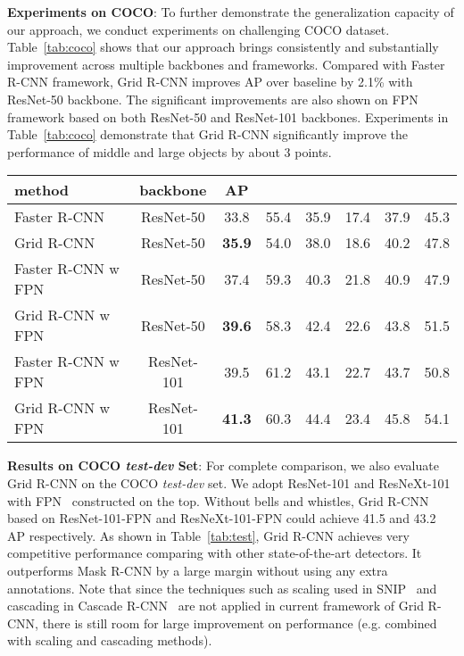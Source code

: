 \documentclass[10pt,twocolumn,letterpaper]{article}
\begin{document}
\textbf{Experiments on COCO}: To further demonstrate the generalization capacity of our approach, we conduct experiments on challenging COCO dataset. Table~\ref{tab:coco} shows that our approach brings consistently and substantially improvement across multiple backbones and frameworks. Compared with Faster R-CNN framework, Grid R-CNN improves AP over baseline by 2.1\% with ResNet-50 backbone. The significant improvements are also shown on FPN framework based on both ResNet-50 and ResNet-101 backbones. Experiments in Table~\ref{tab:coco} demonstrate that Grid R-CNN significantly improve the performance of middle and large objects by about 3 points.
\begin{table*}[t]
\begin{center}
\begin{tabular}{ l | c | c | c  c | c  c  c }
\hline
method & backbone & AP &  &  &  &  &  \\
\hline
Faster R-CNN & ResNet-50 & 33.8 & 55.4 & 35.9 & 17.4 & 37.9 & 45.3 \\
Grid R-CNN & ResNet-50 & \textbf{35.9} & 54.0 & 38.0 & 18.6 & 40.2 & 47.8 \\
\hline
Faster R-CNN w FPN & ResNet-50 & 37.4 & 59.3 & 40.3 & 21.8 & 40.9 & 47.9 \\
Grid R-CNN w FPN & ResNet-50 & \textbf{39.6} & 58.3 & 42.4 & 22.6 & 43.8 & 51.5 \\
\hline
Faster R-CNN w FPN & ResNet-101 & 39.5 & 61.2 & 43.1 & 22.7 & 43.7 & 50.8 \\
Grid R-CNN w FPN & ResNet-101 & \textbf{41.3} & 60.3 & 44.4 & 23.4 & 45.8 & 54.1 \\
\hline
\end{tabular}
\vspace{1mm}
\caption{Bounding box detection AP on COCO \textit{minival}. Grid R-CNN outperforms both Faster R-CNN and FPN on ResNet-50 and ResNet-101 backbone. }
\label{tab:coco}
\end{center}
\end{table*}

\textbf{Results on COCO \textit{test-dev} Set}: For complete comparison, we also evaluate Grid R-CNN on the COCO \textit{test-dev} set. We adopt ResNet-101 and ResNeXt-101~\cite{xie2017aggregated} with FPN~\cite{lin2017feature} constructed on the top. Without bells and whistles, Grid R-CNN based on ResNet-101-FPN and ResNeXt-101-FPN could achieve 41.5 and 43.2 AP respectively. As shown in Table~\ref{tab:test}, Grid R-CNN achieves very competitive performance comparing with other state-of-the-art detectors. It outperforms Mask R-CNN by a large margin without using any extra annotations. Note that since the techniques such as scaling used in SNIP~\cite{DBLP:journals/corr/abs-1711-08189} and cascading in Cascade R-CNN~\cite{cai2017cascade} are not applied in current framework of Grid R-CNN, there is still room for large improvement on performance (e.g. combined with scaling and cascading methods).
\end{document}
